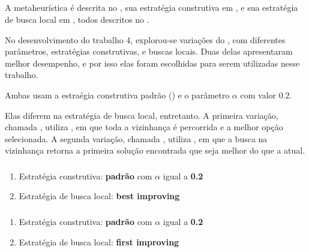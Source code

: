 \subsection{\grasp}
\label{subsection:grasp}

A metaheurística \grasp é descrita no , sua estratégia construtiva em , e sua estratégia de busca local em , todos descritos no .

No desenvolvimento do trabalho 4, explorou-se variações do \grasp, com diferentes parâmetros, estratégias construtivas, e buscas locais. Duas delas apresentaram melhor desempenho, e por isso elas foram escolhidas para serem utilizadas nesse trabalho.

Ambas usam a estraégia construtiva padrão () e o parâmetro $\alpha$ com valor $0.2$.

Elas diferem na estratégia de busca local, entretanto. A primeira variação, chamada \graspBest, utiliza \bestImproving, em que toda a vizinhança é percorrida e a melhor opção selecionada. A segunda variação, chamada \graspFirst, utiliza \firstImproving, em que a busca na vizinhança retorna a primeira solução encontrada que seja melhor do que a atual.

\subsubsection{\graspBest}
\label{subsubsection:grasp-best}

\begin{enumerate}
    \item Estratégia construtiva: \textbf{padrão} com $\alpha$ igual a \textbf{0.2}
    \item Estratégia de busca local: \textbf{best improving}
\end{enumerate}

\subsubsection{\graspFirst}
\label{subsubsection:grasp-first}

\begin{enumerate}
    \item Estratégia construtiva: \textbf{padrão} com $\alpha$ igual a \textbf{0.2}
    \item Estratégia de busca local: \textbf{first improving}
\end{enumerate}
